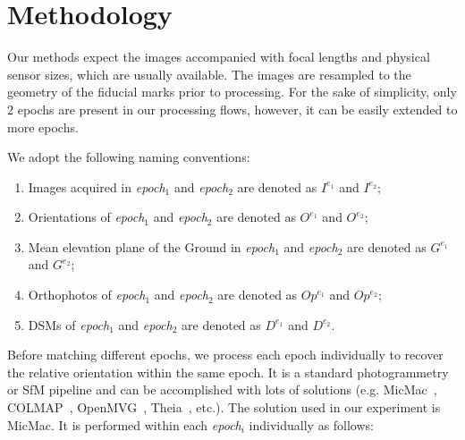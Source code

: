 \section{Methodology}
Our methods expect the images accompanied with focal lengths and physical sensor sizes, which are usually available. The images are resampled to the geometry of the fiducial marks prior to processing. For the sake of simplicity, only 2 epochs are present in our processing flows, however, it can be easily extended to more epochs.
\par
We adopt the following naming conventions:\\
\begin{enumerate}
    \item Images acquired in \textit{epoch$_1$} and \textit{epoch$_2$} are denoted as $I^{e_1}$ and $I^{e_2}$;
    \item Orientations of \textit{epoch$_1$} and \textit{epoch$_2$} are denoted as $O^{e_1}$ and $O^{e_2}$; 
    \item Mean elevation plane of the Ground in \textit{epoch$_1$} and \textit{epoch$_2$} are denoted as $G^{e_1}$ and $G^{e_2}$;
    \item Orthophotos of \textit{epoch$_1$} and \textit{epoch$_2$} are denoted as $Op^{e_1}$ and $Op^{e_2}$; 
    \item DSMs of \textit{epoch$_1$} and \textit{epoch$_2$} are denoted as $D^{e_1}$ and $D^{e_2}$.
\end{enumerate}
\par
Before matching different epochs, we process each epoch individually to recover the relative orientation within the same epoch. It is a standard photogrammetry or SfM pipeline and can be accomplished with lots of solutions (e.g. MicMac~\cite{deseilligny2011apero}, COLMAP~\cite{schonberger2016structure}, {OpenMVG~\cite{openMVG}, Theia~\cite{theia}, etc.}). The solution used in our experiment is MicMac. It is performed within each \textit{epoch$_i$} individually as follows:
